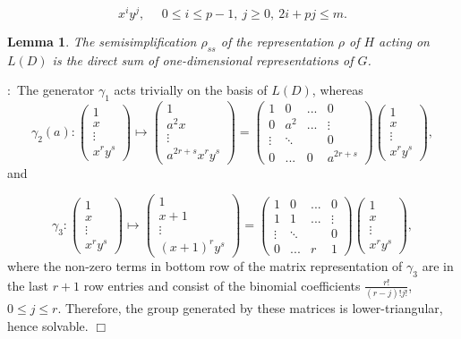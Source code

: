 \documentclass[12pt]{article}
\newtheorem{lemma}[theorem]{Lemma}
\numberwithin{equation}{section}
\def\pf{\noindent {\bf Proof}:\ }
\def\qed{$\Box$}
\begin{document}
\[
x^iy^j,\ \ \ \ \ \ 
0\leq i\leq p-1,\ j\geq 0,\ 2i+pj\leq m.
\]

\begin{lemma}
The semisimplification $\rho_{ss}$ of 
the representation $\rho$ of $H$ acting on $L(D)$ 
is the direct sum of 
one-dimensional representations of $G$.
\end{lemma}

\pf The generator $\gamma_1$ acts trivially on the 
basis of $L(D)$, whereas
\[
\gamma_2(a):
\left(
\begin{array}{c}
1\\
x\\
\vdots \\
x^ry^s
\end{array}
\right)
\longmapsto 
\left(
\begin{array}{c}
1\\
a^2x\\
\vdots \\
a^{2r+s}x^ry^s
\end{array}
\right)
=
\left(
\begin{array}{cccc}
1 & 0 & ...& 0\\
0 & a^2 & ...& \vdots\\
\vdots &\ddots  & &0 \\
0 & ... & 0 & a^{2r+s}
\end{array}
\right)
\left(
\begin{array}{c}
1\\
x\\
\vdots \\
x^ry^s
\end{array}
\right),
\]
and

\[
\gamma_3:
\left(
\begin{array}{c}
1\\
x\\
\vdots \\
x^ry^s
\end{array}
\right)
\longmapsto 
\left(
\begin{array}{c}
1\\
x+1\\
\vdots \\
(x+1)^ry^s
\end{array}
\right)
=
\left(
\begin{array}{cccc}
1 & 0 & ...& 0\\
1 & 1 & ...& \vdots\\
\vdots &\ddots  & &0 \\
0 & ... & r & 1
\end{array}
\right)
\left(
\begin{array}{c}
1\\
x\\
\vdots \\
x^ry^s
\end{array}
\right),
\]
where the non-zero terms in bottom row of the matrix representation of
$\gamma_3$ are in the last $r+1$ row entries and
consist of the binomial coefficients $\frac{r!}{(r-j)!j!}$,
$0\leq j\leq r$.
Therefore, the group generated by these matrices is 
lower-triangular, hence solvable. \qed
\end{document}
